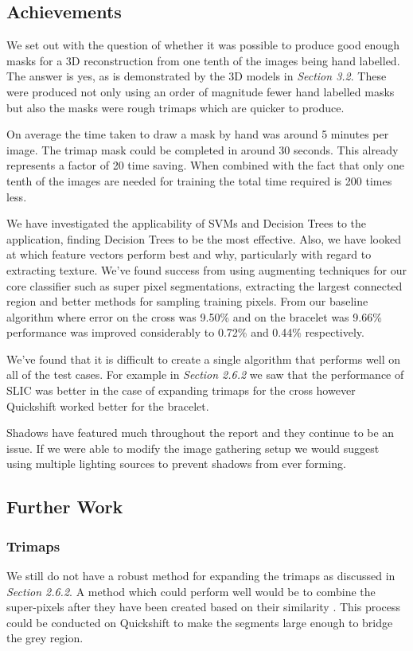 \documentclass[12pt]{IIBproject}
\begin{document}
\subsection{Achievements}
We set out with the question of whether it was possible to produce good enough masks for a 3D reconstruction from one tenth of the images being hand labelled. The answer is yes, as is demonstrated by the 3D models in \emph{Section 3.2}. These were produced not only using an order of magnitude fewer hand labelled masks but also the masks were rough trimaps which are quicker to produce. 

On average the time taken to draw a mask by hand was around 5 minutes per image. The trimap mask could be completed in around 30 seconds. This already represents a factor of 20 time saving. When combined with the fact that only one tenth of the images are needed for training the total time required is 200 times less. 

We have investigated the applicability of SVMs and Decision Trees to the application, finding Decision Trees to be the most effective. Also, we have looked at which feature vectors perform best and why, particularly with regard to extracting texture. We've found success from using augmenting techniques for our core classifier such as super pixel segmentations, extracting the largest connected region and better methods for sampling training pixels. From our baseline algorithm where error on the cross was 9.50\% and on the bracelet was 9.66\% performance was improved considerably to 0.72\% and 0.44\% respectively. 

We've found that it is difficult to create a single algorithm that performs well on all of the test cases. For example in \emph{Section 2.6.2} we saw that the performance of SLIC was better in the case of expanding trimaps for the cross however Quickshift worked better for the bracelet. 

Shadows have featured much throughout the report and they continue to be an issue. If we were able to modify the image gathering setup we would suggest using multiple lighting sources to prevent shadows from ever forming.


\subsection{Further Work}
\subsubsection{Trimaps}
We still do not have a robust method for expanding the trimaps as discussed in \emph{Section 2.6.2}. A method which could perform well would be to combine the super-pixels after they have been created based on their similarity \cite{shih2005automatic}. This process could be conducted on Quickshift to make the segments large enough to bridge the grey region.
\end{document}
